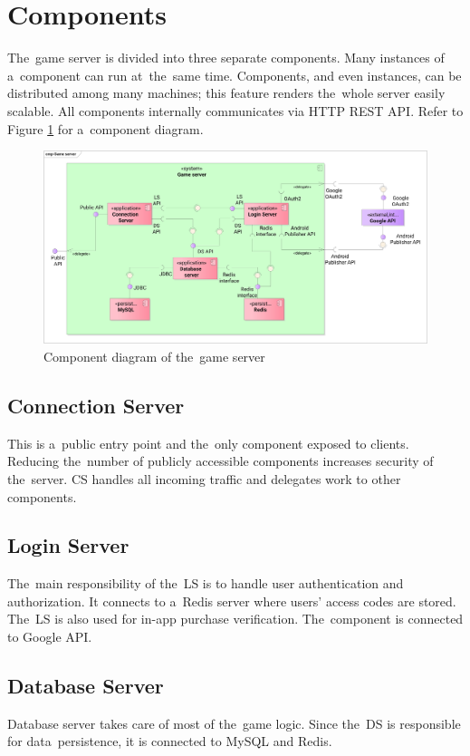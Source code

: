 \section{Components}
The~game server is divided into three separate components. Many instances of a~component can run at~the~same time. Components, and even instances, can be distributed among many machines; this feature renders the~whole server easily scalable. All components internally communicates via HTTP REST API. Refer to Figure \ref{fig:components} for a~component diagram.

\begin{figure}[h]	
	\includegraphics[width=\textwidth]{figures/Components}
	\centering			
	\caption{Component diagram of the~game server}
	\label{fig:components}
\end{figure}

	\subsection{Connection Server}
	This is a~public entry point and the~only component exposed to clients. Reducing the~number of publicly accessible components increases security of the~server. CS handles all incoming traffic and delegates work to other components. 
	
	\subsection{Login Server}
	The~main responsibility of the~LS is to handle user authentication and authorization. It connects to a~Redis server where users' access codes are stored. The~LS is also used for in-app purchase verification. The~component is connected to Google API.
	
	\subsection{Database Server}
	Database server takes care of most of the~game logic. Since the~DS is responsible for data~persistence, it is connected to MySQL and Redis.

